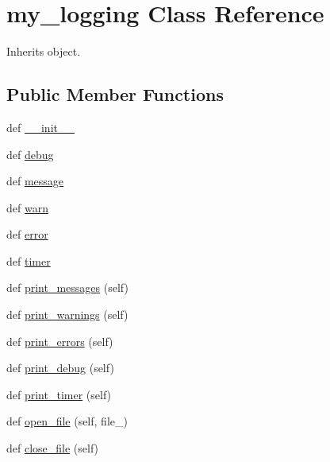 \hypertarget{classpyneb_1_1utils_1_1logging_1_1my__logging}{}\section{my\+\_\+logging Class Reference}
\label{classpyneb_1_1utils_1_1logging_1_1my__logging}


Inherits object.

\subsection*{Public Member Functions}
\begin{DoxyCompactItemize}
\item 
def \hyperlink{classpyneb_1_1utils_1_1logging_1_1my__logging_ac775ee34451fdfa742b318538164070e}{\+\_\+\+\_\+init\+\_\+\+\_\+}
\item 
def \hyperlink{classpyneb_1_1utils_1_1logging_1_1my__logging_a6aa6c68bdbce2ce3a32398d358d1d461}{debug}
\item 
def \hyperlink{classpyneb_1_1utils_1_1logging_1_1my__logging_ae4786d0b743ca42ce51f3cb0a2322f49}{message}
\item 
def \hyperlink{classpyneb_1_1utils_1_1logging_1_1my__logging_a5af91acacd75772464bda89e7d1dcbce}{warn}
\item 
def \hyperlink{classpyneb_1_1utils_1_1logging_1_1my__logging_a3133d4a0dde10b6ebe257e3db716a3e0}{error}
\item 
def \hyperlink{classpyneb_1_1utils_1_1logging_1_1my__logging_a95b119fa123f2d1393ae994f18756085}{timer}
\item 
def \hyperlink{classpyneb_1_1utils_1_1logging_1_1my__logging_ac3a870c2a39d23ce5ee7237309ad4ecc}{print\+\_\+messages} (self)
\item 
def \hyperlink{classpyneb_1_1utils_1_1logging_1_1my__logging_a1e2843713bf1c1c9cd42760b789b2816}{print\+\_\+warnings} (self)
\item 
def \hyperlink{classpyneb_1_1utils_1_1logging_1_1my__logging_a635e92de5adbd5bbfa837dd2283e4df7}{print\+\_\+errors} (self)
\item 
def \hyperlink{classpyneb_1_1utils_1_1logging_1_1my__logging_abfa35b10e182422bf69a3a1a70f5e34e}{print\+\_\+debug} (self)
\item 
def \hyperlink{classpyneb_1_1utils_1_1logging_1_1my__logging_a330566dd537bf46249c96ebba54783c5}{print\+\_\+timer} (self)
\item 
def \hyperlink{classpyneb_1_1utils_1_1logging_1_1my__logging_aeec9ea9631053915e0244b275d3c0d3a}{open\+\_\+file} (self, file\+\_\+)
\item 
def \hyperlink{classpyneb_1_1utils_1_1logging_1_1my__logging_ae560dbc6caff41893ec8e24657e7ac62}{close\+\_\+file} (self)
\end{DoxyCompactItemize}
